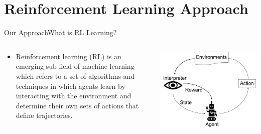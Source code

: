 \documentclass{beamer}
\begin{document}
\section{Reinforcement Learning Approach}
\begin{frame}{Our Approach}{What is RL Learning?}
\begin{columns}
\begin{column}{0.5\textwidth}
\begin{itemize}
\item Reinforcement learning (RL) is an emerging sub-field of
machine learning which refers to a set of algorithms and
techniques in which agents learn by interacting with the
environment and determine their own sets of actions that define
trajectories.
\end{itemize}
\end{column}
\begin{column}{0.5\textwidth}
\includegraphics[scale=0.25]{figs/img/Ref-L-agent.pdf}
\end{column}
\end{columns}
\end{frame}
\end{document}
